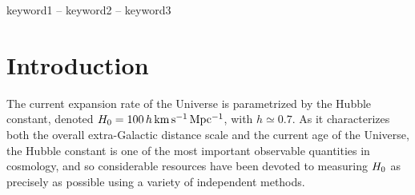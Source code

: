 \documentclass[a4paper,fleqn,usenatbib]{mnras}
\newcommand{\kmsmpc}{\ensuremath{{\rm km\,s^{-1}\,Mpc^{-1}}}}
\begin{document}
\begin{keywords}
keyword1 -- keyword2 -- keyword3
\end{keywords}



\section{Introduction}
\label{section:intro}

The current expansion rate of the Universe is 
parametrized by the Hubble constant, 
denoted
$\hubble = 100 \, h \, \kmsmpc$,
with $h \simeq 0.7$.
As it
characterizes both the overall extra-Galactic distance scale
and the current age of the Universe,
the Hubble constant is one of the most important 
observable quantities in cosmology,
and so considerable resources have been devoted to measuring
$H_0$ as precisely as possible
using a variety of independent methods.
\end{document}
